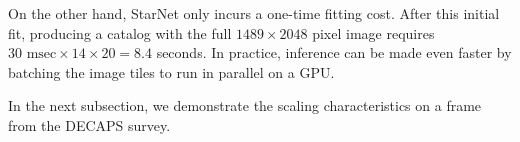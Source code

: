 On the other hand, StarNet only incurs a one-time fitting cost.
After this initial fit,
producing a catalog with the full $1489 \times 2048$ pixel image requires
$30\text{ msec} \times 14 \times 20 = 8.4$ seconds. In practice,
inference can be made even faster by batching the image tiles to run in parallel on a GPU.

In the next subsection, we demonstrate the scaling characteristics on a frame from
the DECAPS survey.







